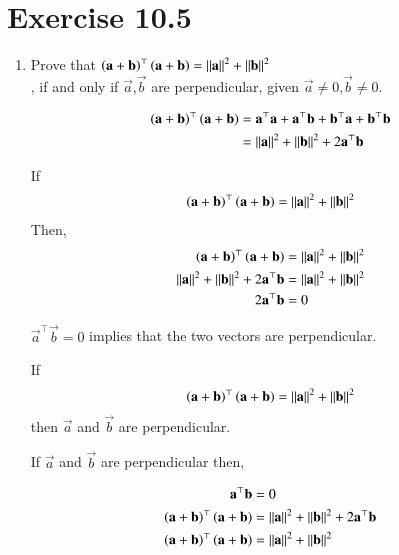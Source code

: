 \documentclass[journal,12pt,twocolumn]{IEEEtran}
\begin{document}
\section{Exercise 10.5}
\begin{enumerate}

\item Prove that $\left(\mathbf{a}+\mathbf{b}\right)^{\top}\left(\mathbf{a}+\mathbf{b}\right)=\left\lVert\mathbf{a}\right\rVert^2+\left\lVert\mathbf{b}\right\rVert^2$\\, if and only if $\vec{a}$,$\vec{b}$ are perpendicular, given $\vec{a}\neq0$,$\vec{b}\neq0$.

	\begin{align}
		\left(\mathbf{a}+\mathbf{b}\right)^{\top}\left(\mathbf{a}+\mathbf{b}\right) &= \mathbf{a}^{\top}\mathbf{a}+\mathbf{a}^{\top}\mathbf{b}+\mathbf{b}^{\top}\mathbf{a}+\mathbf{b}^{\top}\mathbf{b}\\
		&= \left\lVert\mathbf{a}\right\rVert^2+\left\lVert\mathbf{b}\right\rVert^2+2\mathbf{a}^{\top}\mathbf{b}
	\end{align}

	If 
	\begin{align}
		\left(\mathbf{a}+\mathbf{b}\right)^{\top}\left(\mathbf{a}+\mathbf{b}\right)=\left\lVert\mathbf{a}\right\rVert^2+\left\lVert\mathbf{b}\right\rVert^2
	\end{align}
	Then,
	\begin{align}
		\left(\mathbf{a}+\mathbf{b}\right)^{\top}\left(\mathbf{a}+\mathbf{b}\right)&=\left\lVert\mathbf{a}\right\rVert^2+\left\lVert\mathbf{b}\right\rVert^2\\
		\left\lVert\mathbf{a}\right\rVert^2+\left\lVert\mathbf{b}\right\rVert^2+2\mathbf{a}^{\top}\mathbf{b} &= \left\lVert\mathbf{a}\right\rVert^2+\left\lVert\mathbf{b}\right\rVert^2\\
		2\mathbf{a}^{\top}\mathbf{b} &= 0 
	\end{align}

	$\vec{a}^{\top}\vec{b}=0$ implies that the two vectors are perpendicular.

	If 
	\begin{align}
		\left(\mathbf{a}+\mathbf{b}\right)^{\top}\left(\mathbf{a}+\mathbf{b}\right)=\left\lVert\mathbf{a}\right\rVert^2+\left\lVert\mathbf{b}\right\rVert^2
	\end{align}
	then $\vec{a}$ and $\vec{b}$ are perpendicular.

	If $\vec{a}$ and $\vec{b}$ are perpendicular then,

	\begin{align}
		\mathbf{a}^{\top}\mathbf{b} &= 0\\
		\left(\mathbf{a}+\mathbf{b}\right)^{\top}\left(\mathbf{a}+\mathbf{b}\right) &= \left\lVert\mathbf{a}\right\rVert^2+\left\lVert\mathbf{b}\right\rVert^2+2\mathbf{a}^{\top}\mathbf{b}\\
		\left(\mathbf{a}+\mathbf{b}\right)^{\top}\left(\mathbf{a}+\mathbf{b}\right) &= \left\lVert\mathbf{a}\right\rVert^2+\left\lVert\mathbf{b}\right\rVert^2
	\end{align}


\end{enumerate}
\end{document}
